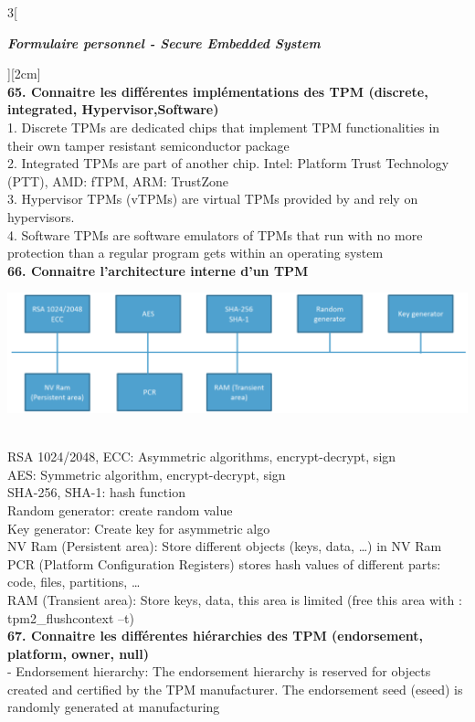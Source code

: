\begin{multicols}{3}[\centerline{ \large\em \textbf{Formulaire personnel - Secure Embedded System}}][2cm]
\\ \textbf{65. Connaitre les différentes implémentations des TPM (discrete, integrated, Hypervisor,Software)\\}
1. Discrete TPMs are dedicated chips that implement TPM functionalities in their own tamper resistant semiconductor package\\
2. Integrated TPMs are part of another chip. Intel: Platform Trust Technology (PTT), AMD: fTPM, ARM: TrustZone\\
3. Hypervisor TPMs (vTPMs) are virtual TPMs provided by and rely on hypervisors.\\
4. Software TPMs are software emulators of TPMs that run with no more protection than a regular program gets within an operating system
\\ \textbf{66. Connaitre l’architecture interne d’un TPM\\}
\begin{minipage}{\linewidth}
	\centering
    \includegraphics[width =0.8\columnwidth]{images/47.png}
\end{minipage}\\
RSA 1024/2048, ECC: Asymmetric algorithms, encrypt-decrypt, sign\\
AES: Symmetric algorithm, encrypt-decrypt, sign\\
SHA-256, SHA-1: hash function\\
Random generator: create random value\\
Key generator: Create key for asymmetric algo\\
NV Ram (Persistent area): Store different objects (keys, data, …) in NV Ram\\
PCR (Platform Configuration Registers) stores hash values of different parts: code, files, partitions, …\\
RAM (Transient area): Store keys, data, this area is limited (free this area with : tpm2\_flushcontext –t)
\\ \textbf{67. Connaitre les différentes hiérarchies des TPM (endorsement, platform, owner, null)\\}
- Endorsement hierarchy: The endorsement hierarchy is reserved for objects created and certified by the TPM manufacturer. The endorsement seed (eseed) is randomly generated at manufacturing

\end{multicols}
